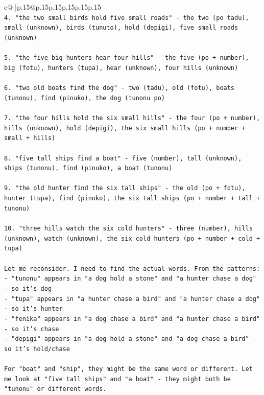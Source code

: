 \documentclass{article}
\begin{document}
{\begin{supertabular}{c@{$\;$}|p{.15\linewidth}@{}p{.15\linewidth}p{.15\linewidth}p{.15\linewidth}p{.15\linewidth}p{.15\linewidth}}
{{{\\ 
\texttt{4. "the two small birds hold five small roads" {-} the two (po tadu), small (unknown), birds (tunuto), hold (depigi), five small roads (unknown)} \\
\\ 
\texttt{5. "the five big hunters hear four hills" {-} the five (po + number), big (fotu), hunters (tupa), hear (unknown), four hills (unknown)} \\
\\ 
\texttt{6. "two old boats find the dog" {-} two (tadu), old (fotu), boats (tunonu), find (pinuko), the dog (tunonu po)} \\
\\ 
\texttt{7. "the four hills hold the six small hills" {-} the four (po + number), hills (unknown), hold (depigi), the six small hills (po + number + small + hills)} \\
\\ 
\texttt{8. "five tall ships find a boat" {-} five (number), tall (unknown), ships (tunonu), find (pinuko), a boat (tunonu)} \\
\\ 
\texttt{9. "the old hunter find the six tall ships" {-} the old (po + fotu), hunter (tupa), find (pinuko), the six tall ships (po + number + tall + tunonu)} \\
\\ 
\texttt{10. "three hills watch the six cold hunters" {-} three (number), hills (unknown), watch (unknown), the six cold hunters (po + number + cold + tupa)} \\
\\ 
\texttt{Let me reconsider. I need to find the actual words. From the patterns:} \\
\texttt{{-} "tunonu" appears in "a dog hold a stone" and "a hunter chase a dog" {-} so it's dog} \\
\texttt{{-} "tupa" appears in "a hunter chase a bird" and "a hunter chase a dog" {-} so it's hunter} \\
\texttt{{-} "fenika" appears in "a dog chase a bird" and "a hunter chase a bird" {-} so it's chase} \\
\texttt{{-} "depigi" appears in "a dog hold a stone" and "a dog chase a bird" {-} so it's hold/chase} \\
\\ 
\texttt{For "boat" and "ship", they might be the same word or different. Let me look at "five tall ships" and "a boat" {-} they might both be "tunonu" or different words.} \\
}}}
\end{supertabular}}
\end{document}
